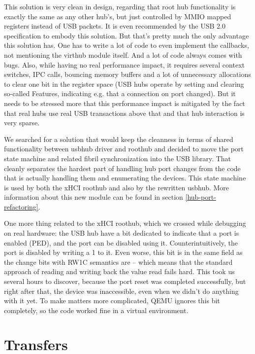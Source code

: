 This solution is very clean in design, regarding that root hub functionality is
exactly the same as any other hub's, but just controlled by MMIO mapped
registers instead of USB packets. It is even recommended by the USB 2.0			%
specification to embody this solution. But that's pretty much the only advantage
this solution has. One has to write a lot of code to even implement the
callbacks, not mentioning the virthub module itself. And a lot of code always
comes with bugs. Also, while having no real performance impact, it requires
several context switches, IPC calls, bouncing memory buffers and a lot of
unnecessary allocations to clear one bit in the register space (USB hubs
operate by setting and clearing so-called Features, indicating e.g. that
a connection on port changed). But it needs to be stressed more that this
performance impact is mitigated by the fact that real hubs use real USB transactions
above that and that hub interaction is very sparse.

We searched for a solution that would keep the cleanness in terms of shared
functionality between usbhub driver and roothub and decided to move the port
state machine and related fibril synchronization into the USB library. That
cleanly separates the hardest part of handling hub port changes from the code
that is actually handling them and enumerating the devices. This state machine
is used by both the xHCI roothub and also by the rewritten usbhub. More
information about this new module can be found in section \ref{hub-port-refactoring}.

One more thing related to the xHCI roothub, which we crossed while debugging on
real hardware: the USB hub have a bit dedicated to indicate that a port is
enabled (PED), and the port can be disabled using it. Counterintuitively, the
port is disabled by writing a 1 to it. Even worse, this bit is in the same
field as the change bits with RW1C semantics are -- which means that the
standard approach of reading and writing back the value read fails hard. This
took us several hours to discover, because the port reset was completed
successfully, but right after that, the device was inaccessible, even when we
didn't do anything with it yet. To make matters more complicated, QEMU ignores
this bit completely, so the code worked fine in a virtual environment.


\section{Transfers}

